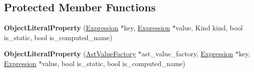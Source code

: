 \subsection*{Protected Member Functions}
\begin{DoxyCompactItemize}
\item 
{\bfseries Object\+Literal\+Property} (\hyperlink{classv8_1_1internal_1_1_expression}{Expression} $\ast$key, \hyperlink{classv8_1_1internal_1_1_expression}{Expression} $\ast$value, Kind kind, bool is\+\_\+static, bool is\+\_\+computed\+\_\+name)\hypertarget{classv8_1_1internal_1_1_object_literal_property_aad428286f2f11f7679efbc31cc847328}{}\label{classv8_1_1internal_1_1_object_literal_property_aad428286f2f11f7679efbc31cc847328}

\item 
{\bfseries Object\+Literal\+Property} (\hyperlink{classv8_1_1internal_1_1_ast_value_factory}{Ast\+Value\+Factory} $\ast$ast\+\_\+value\+\_\+factory, \hyperlink{classv8_1_1internal_1_1_expression}{Expression} $\ast$key, \hyperlink{classv8_1_1internal_1_1_expression}{Expression} $\ast$value, bool is\+\_\+static, bool is\+\_\+computed\+\_\+name)\hypertarget{classv8_1_1internal_1_1_object_literal_property_a059279e0da1eefc8ca95d83011a69298}{}\label{classv8_1_1internal_1_1_object_literal_property_a059279e0da1eefc8ca95d83011a69298}

\end{DoxyCompactItemize}
